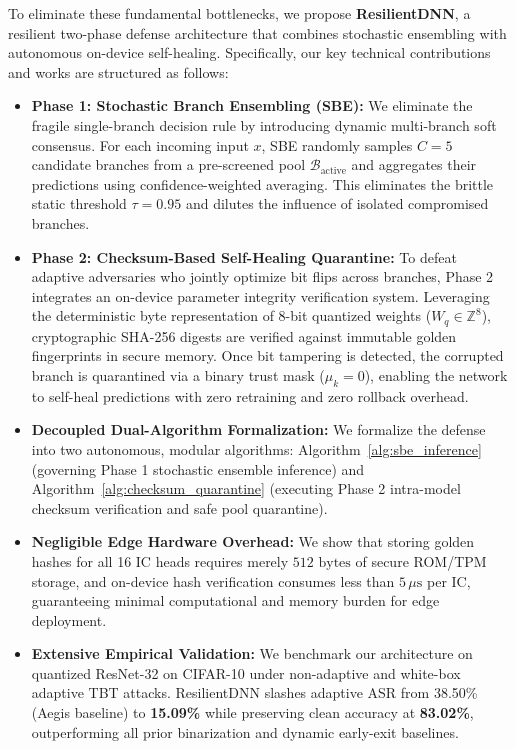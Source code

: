 \documentclass[conference,10pt]{IEEEtran}
\begin{document}
To eliminate these fundamental bottlenecks, we propose \textbf{ResilientDNN}, a resilient two-phase defense architecture that combines stochastic ensembling with autonomous on-device self-healing. Specifically, our key technical contributions and works are structured as follows:

\begin{itemize}
    \item \textbf{Phase 1: Stochastic Branch Ensembling (SBE):} We eliminate the fragile single-branch decision rule by introducing dynamic multi-branch soft consensus. For each incoming input $x$, SBE randomly samples $C = 5$ candidate branches from a pre-screened pool $\mathcal{B}_{\text{active}}$ and aggregates their predictions using confidence-weighted averaging. This eliminates the brittle static threshold $\tau = 0.95$ and dilutes the influence of isolated compromised branches.
    
    \item \textbf{Phase 2: Checksum-Based Self-Healing Quarantine:} To defeat adaptive adversaries who jointly optimize bit flips across branches, Phase 2 integrates an on-device parameter integrity verification system. Leveraging the deterministic byte representation of 8-bit quantized weights ($W_q \in \mathbb{Z}^8$), cryptographic SHA-256 digests are verified against immutable golden fingerprints in secure memory. Once bit tampering is detected, the corrupted branch is quarantined via a binary trust mask ($\mu_k = 0$), enabling the network to self-heal predictions with zero retraining and zero rollback overhead.
    
    \item \textbf{Decoupled Dual-Algorithm Formalization:} We formalize the defense into two autonomous, modular algorithms: Algorithm~\ref{alg:sbe_inference} (governing Phase 1 stochastic ensemble inference) and Algorithm~\ref{alg:checksum_quarantine} (executing Phase 2 intra-model checksum verification and safe pool quarantine).
    
    \item \textbf{Negligible Edge Hardware Overhead:} We show that storing golden hashes for all 16 IC heads requires merely $512\text{ bytes}$ of secure ROM/TPM storage, and on-device hash verification consumes less than $5\,\mu\text{s}$ per IC, guaranteeing minimal computational and memory burden for edge deployment.
    
    \item \textbf{Extensive Empirical Validation:} We benchmark our architecture on quantized ResNet-32 on CIFAR-10 under non-adaptive and white-box adaptive TBT attacks. ResilientDNN slashes adaptive ASR from 38.50\% (Aegis baseline) to \textbf{15.09\%} while preserving clean accuracy at \textbf{83.02\%}, outperforming all prior binarization and dynamic early-exit baselines.
\end{itemize}
\end{document}
